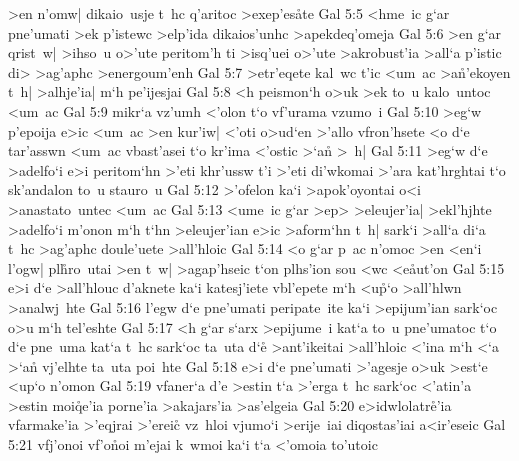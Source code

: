>en
n'omw|
dikaio~usje
t~hc
q'aritoc
>e\-xe\-p'e\-s\r{a}\-te\bibvsend
{}
\vs Gal 5:5
<hme~ic
g`ar
pne'umati
>ek
p'istewc
>elp'ida
dikaios'unhc
>apekdeq'omeja\bibvsend
\vs Gal 5:6
>en
g`ar
qrist~w|
>ihso~u
o>'ute
peritom'h
ti
>isq'uei
o>'ute
>akrobust'ia
>all`a
p'istic
di>
>ag'aphc
>energoum'enh\bibvsend
\vs Gal 5:7
>etr'eqete
kal~wc
t'ic
<um~ac
>a\r{n}'ekoyen
t~h|
>alhje'ia|
m`h
pe'ijesjai\bibvsend
\vs Gal 5:8
<h
peismon`h
o>uk
>ek
to~u
kalo~untoc
<um~ac\bibvsend
\vs Gal 5:9
mikr`a
vz'umh
<'olon
t`o
vf'urama
vzumo~i\bibvsend
\vs Gal 5:10
>eg`w
p'epoija
e>ic
<um~ac
>en
kur'iw|
<'oti
o>ud`en
>'allo
vfron'hsete
<o
d`e
tar'asswn
<um~ac
vbast'asei
t`o
kr'ima
<'ostic
>`a\r{n}
>~h|\bibvsend
\vs Gal 5:11
>eg`w
d`e
>adelfo`i
e>i
peritom`hn
>'eti
khr'ussw
t'i
>'eti
di'wkomai
>'ara
kat'hrghtai
t`o
sk'andalon
to~u
stauro~u\bibvsend
\vs Gal 5:12
>'ofelon
ka`i
>apok'oyontai
o<i
>anastato~untec
<um~ac\bibvsend
\vs Gal 5:13
<ume~ic
g`ar
>ep>
>eleujer'ia|
>ekl'hjhte
>adelfo`i
m'onon
m`h
t`hn
>eleujer'ian
e>ic
>aform`hn
t~h|
sark`i
>all`a
di`a
t~hc
>ag'aphc
doule'uete
>all'hloic\bibvsend
\vs Gal 5:14
<o
g`ar
p~ac
n'omoc
>en
<en`i
l'ogw|
pl\r{h}ro~utai
>en
t~w|
>agap'hseic
t`on
plhs'ion
sou
<wc
<e\r{a}ut'on\bibvsend
{}
\vs Gal 5:15
e>i
d`e
>all'hlouc
d'aknete
ka`i
katesj'iete
vbl'epete
m`h
<u\r{p}`o
>all'hlwn
>analwj~hte\bibvsend
\vs Gal 5:16
l'egw
d`e
pne'umati
peripate~ite
ka`i
>epijum'ian
sark`oc
o>u
m`h
tel'eshte\bibvsend
\vs Gal 5:17
<h
g`ar
s`arx
>epijume~i
kat`a
to~u
pne'umatoc
t`o
d`e
pne~uma
kat`a
t~hc
sark`oc
ta~uta
d`e\r{}
>ant'ikeitai
>all'hloic
<'ina
m`h
<`a
>`a\r{n}
vj'elhte
ta~uta
poi~hte\bibvsend
\vs Gal 5:18
e>i
d`e
pne'umati
>'agesje
o>uk
>est`e
<up`o
n'omon\bibvsend
\vs Gal 5:19
vfaner`a
d'e
>estin
t`a
>'erga
t~hc
sark`oc
<'atin'a
>estin
moi\r{q}e'ia
porne'ia
>akajars'ia
>as'elgeia\bibvsend
\vs Gal 5:20
e>idwlolatr\r{e}'ia
vfarmake'ia
>'eqjrai
>'ereic\r{}
vz~hloi
vjumo`i
>erije~iai
diqostas'iai
a<ir'eseic\bibvsend
\vs Gal 5:21
vfj'onoi
vf'o\r{n}oi
m'ejai
k~wmoi
ka`i
t`a
<'omoia
to'utoic
